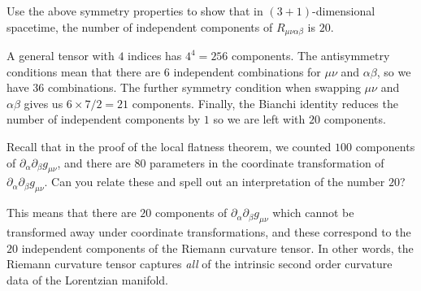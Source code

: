 \documentclass{../../templates/lkx_pset}
\begin{document}
\begin{parts}
	\begin{part}{}
		Use the above symmetry properties to show that in $(3+1)$-dimensional spacetime, the number of independent components of $R_{\mu\nu\alpha\beta}$ is $20$.
	\end{part}

	A general tensor with $4$ indices has $4^4 = 256$ components. The antisymmetry conditions mean that there are $6$ independent combinations for $\mu\nu$ and $\alpha\beta$, so we have $36$ combinations. The further symmetry condition when swapping $\mu\nu$ and $\alpha\beta$ gives us $6\times 7/2=21$ components. Finally, the Bianchi identity reduces the number of independent components by $1$ so we are left with $20$ components.

	\begin{part}{}
		Recall that in the proof of the local flatness theorem, we counted $100$ components of $\partial_\alpha\partial_\beta g_{\mu\nu}$, and there are 80 parameters in the coordinate transformation of $\partial_\alpha\partial_\beta g_{\mu\nu}$. Can you relate these and spell out an interpretation of the number $20$?
	\end{part}

	This means that there are $20$ components of $\partial_\alpha\partial_\beta g_{\mu\nu}$ which cannot be transformed away under coordinate transformations, and these correspond to the $20$ independent components of the Riemann curvature tensor. In other words, the Riemann curvature tensor captures \emph{all} of the intrinsic second order curvature data of the Lorentzian manifold.
\end{parts}
\end{document}
